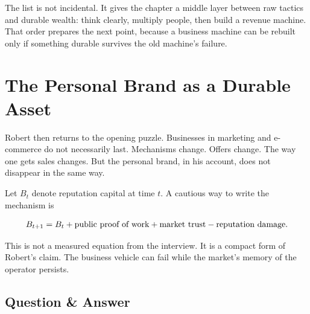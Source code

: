 The list is not incidental. It gives the chapter a middle layer between raw tactics and durable wealth: think clearly, multiply people, then build a revenue machine. That order prepares the next point, because a business machine can be rebuilt only if something durable survives the old machine's failure.

\section{The Personal Brand as a Durable Asset}

Robert then returns to the opening puzzle. Businesses in marketing and e-commerce do not necessarily last. Mechanisms change. Offers change. The way one gets sales changes. But the personal brand, in his account, does not disappear in the same way.

Let \(B_t\) denote reputation capital at time \(t\). A cautious way to write the mechanism is

\begin{equation}
B_{t+1}
=
B_t
+
\hbox{public proof of work}
+
\hbox{market trust}
-
\hbox{reputation damage}.
\end{equation}

This is not a measured equation from the interview. It is a compact form of Robert's claim. The business vehicle can fail while the market's memory of the operator persists.

\begin{figure}
\centering
{}
\end{figure}

\subsection{Question \& Answer}

